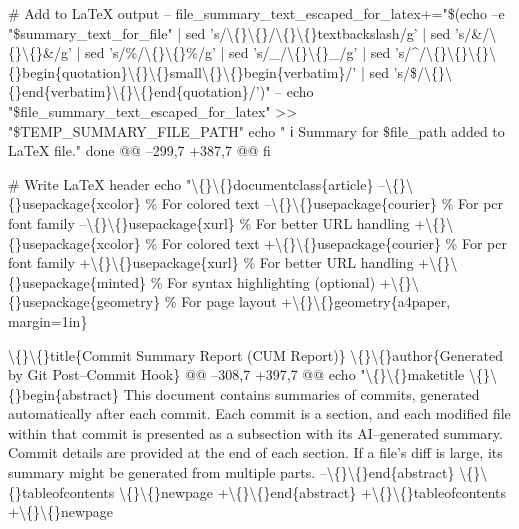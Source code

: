 \documentclass{article}
\begin{document}
{     \# Add to LaTeX output
--    file\_summary\_text\_escaped\_for\_latex+="\$(echo --e "\$summary\_text\_for\_file" | sed 's/\textbackslash\{\}\textbackslash\{\}/\textbackslash\{\}\textbackslash\{\}textbackslash/g' | sed 's/\&/\textbackslash\{\}\textbackslash\{\}\&/g' | sed 's/\%/\textbackslash\{\}\textbackslash\{\}\%/g' | sed 's/\_/\textbackslash\{\}\textbackslash\{\}\_/g' | sed 's/\^{}/\textbackslash\{\}\textbackslash\{\}\textbackslash\{\}\textbackslash\{\}begin\{quotation\}\textbackslash\{\}\textbackslash\{\}small\textbackslash\{\}\textbackslash\{\}begin\{verbatim\}/' | sed 's/\$/\textbackslash\{\}\textbackslash\{\}end\{verbatim\}\textbackslash\{\}\textbackslash\{\}end\{quotation\}/')"
--    echo "\$file\_summary\_text\_escaped\_for\_latex" \textgreater{}\textgreater{} "\$TEMP\_SUMMARY\_FILE\_PATH"
     echo "   ℹ️ Summary for \$file\_path added to LaTeX file."
 done
@@ --299,7 +387,7 @@ fi
 
 \# Write LaTeX header
 echo "\textbackslash\{\}\textbackslash\{\}documentclass\{article\}
--\textbackslash\{\}\textbackslash\{\}usepackage\{xcolor\}      \% For colored text
--\textbackslash\{\}\textbackslash\{\}usepackage\{courier\}      \% For pcr font family
--\textbackslash\{\}\textbackslash\{\}usepackage\{xurl\}         \% For better URL handling
+\textbackslash\{\}\textbackslash\{\}usepackage\{xcolor\}      \% For colored text
+\textbackslash\{\}\textbackslash\{\}usepackage\{courier\}      \% For pcr font family
+\textbackslash\{\}\textbackslash\{\}usepackage\{xurl\}         \% For better URL handling
+\textbackslash\{\}\textbackslash\{\}usepackage\{minted\}       \% For syntax highlighting (optional)
+\textbackslash\{\}\textbackslash\{\}usepackage\{geometry\}     \% For page layout
+\textbackslash\{\}\textbackslash\{\}geometry\{a4paper, margin=1in\}
 
 \textbackslash\{\}\textbackslash\{\}title\{Commit Summary Report (CUM Report)\}
 \textbackslash\{\}\textbackslash\{\}author\{Generated by Git Post--Commit Hook\}
@@ --308,7 +397,7 @@ echo "\textbackslash\{\}\textbackslash\{\}maketitle
 \textbackslash\{\}\textbackslash\{\}begin\{abstract\}
 This document contains summaries of commits, generated automatically after each commit. Each commit is a section, and each modified file within that commit is presented as a subsection with its AI--generated summary. Commit details are provided at the end of each section. If a file's diff is large, its summary might be generated from multiple parts.
--\textbackslash\{\}\textbackslash\{\}end\{abstract\}
 \textbackslash\{\}\textbackslash\{\}tableofcontents
 \textbackslash\{\}\textbackslash\{\}newpage
+\textbackslash\{\}\textbackslash\{\}end\{abstract\}
+\textbackslash\{\}\textbackslash\{\}tableofcontents
+\textbackslash\{\}\textbackslash\{\}newpage
 
}
\end{document}
